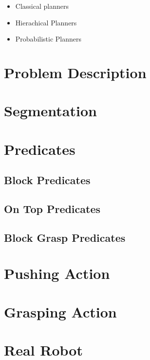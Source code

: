 \begin{itemize}
\item Classical planners
\item Hierachical Planners
\item Probabilistic Planners
\end{itemize}

\section{Problem Description}

\section{Segmentation}
\section{Predicates}
\subsection{Block Predicates}
\subsection{On Top Predicates}
\subsection{Block Grasp Predicates}
\section{Pushing Action}
\section{Grasping Action}
\section{Real Robot }


